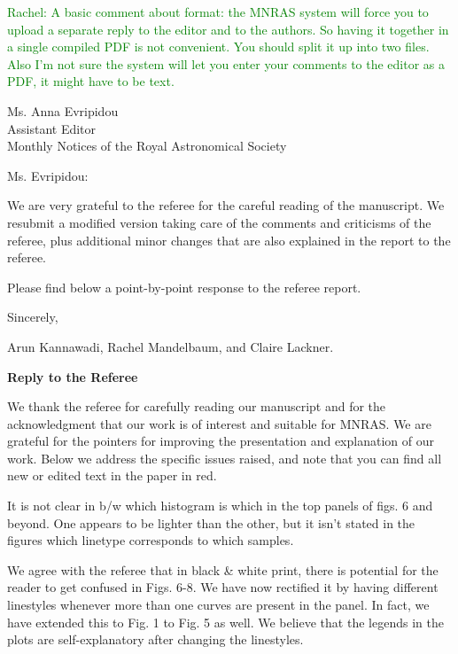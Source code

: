 \documentclass[english]{letter}
\newcommand{\rachel}[1]{\textrm{\textcolor{green}{Rachel: #1}}}
\begin{document}
\date{\today}

\rachel{A basic comment about format: the MNRAS system will force you to upload a separate reply to
  the editor and to the authors.  So having it together in a single compiled PDF is not convenient.
  You should split it up into two files.  Also I'm not sure the system will let you enter your
  comments to the editor as a PDF, it might have to be text.}

\begin{letter}{Ms. Anna Evripidou\\ Assistant Editor\\ Monthly Notices of the 
Royal Astronomical Society}

\opening{Ms. Evripidou:}

We are very grateful to the referee for the careful reading of the manuscript.
We resubmit a modified version taking care of the comments and criticisms of the referee, plus
additional minor changes that are also explained in the report to the referee.
 
Please find below a point-by-point response to the referee report.

\closing{Sincerely,}
Arun Kannawadi, Rachel Mandelbaum, and Claire Lackner.
\end{letter}
\vspace{20pt}
{\bf Reply to the Referee}

We thank the referee for carefully reading our manuscript and for the acknowledgment that our work is of interest
and suitable for MNRAS. We are grateful for the pointers for improving the presentation and
explanation of our work. 
Below we address the specific issues raised, and note that you can find all new or edited text in
the paper in red.

\begin{shaded}
It is not clear in b/w which histogram is which in the top panels of figs. 6 and beyond. One appears to be lighter than the other, but it isn't stated in the figures which linetype corresponds to which samples.
\end{shaded}
\noindent
We agree with the referee that in black \& white print, there is potential for the reader to get confused in Figs. 6-8.
We have now rectified it by having different linestyles whenever more than one curves are present in the panel. In fact, we have extended this to Fig. 1 to Fig. 5 as well. We believe that the legends in the plots are self-explanatory after changing the linestyles.
\end{document}
